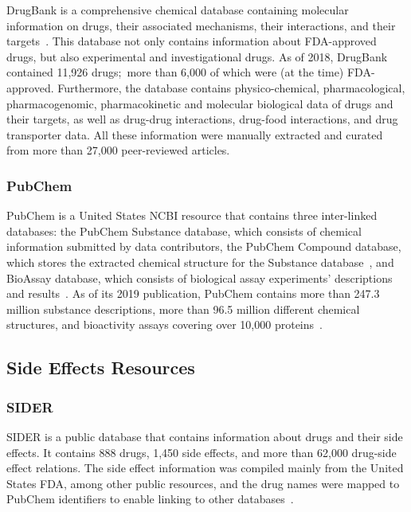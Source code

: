 DrugBank is a comprehensive chemical database containing molecular information on drugs, their associated mechanisms, their interactions, and their targets~\cite{wishart_drugbank_2018}.
This database not only contains information about \ac{FDA}-approved drugs, but also experimental and investigational drugs.
As of 2018, DrugBank contained 11,926 drugs;~more than 6,000 of which were (at the time) \ac{FDA}-approved.
Furthermore, the database contains physico-chemical, pharmacological, pharmacogenomic, pharmacokinetic and molecular biological data of drugs and their targets, as well as drug-drug interactions, drug-food interactions, and drug transporter data.
All these information were manually extracted and curated from more than 27,000 peer-reviewed articles.

\subsubsection{PubChem}

PubChem is a United States \ac{NCBI} resource that contains three inter-linked databases: the PubChem Substance database, which consists of chemical information submitted by data contributors, the PubChem Compound database, which stores the extracted chemical structure for the Substance database~\cite{kim_pubchem_2016}, and BioAssay database, which consists of biological assay experiments’ descriptions and results~\cite{kim_pubchem_2019}.
As of its 2019 publication, PubChem contains more than 247.3 million substance descriptions, more than 96.5 million different chemical structures, and bioactivity assays covering over 10,000 proteins~\cite{kim_pubchem_2019}.

\subsection{Side Effects Resources}

\subsubsection{SIDER}

\ac{SIDER} is a public database that contains information about drugs and their side effects.
It contains 888 drugs, 1,450 side effects, and more than 62,000 drug-side effect relations.
The side effect information was compiled mainly from the United States \ac{FDA}, among other public resources, and the drug names were mapped to PubChem identifiers to enable linking to other databases~\cite{kuhn_side_2010}.

